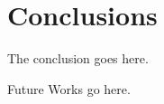 \documentclass[conference]{IEEEtran}
\begin{document}



\section{Conclusions}
The conclusion goes here. 

Future Works go here.












\end{document}
